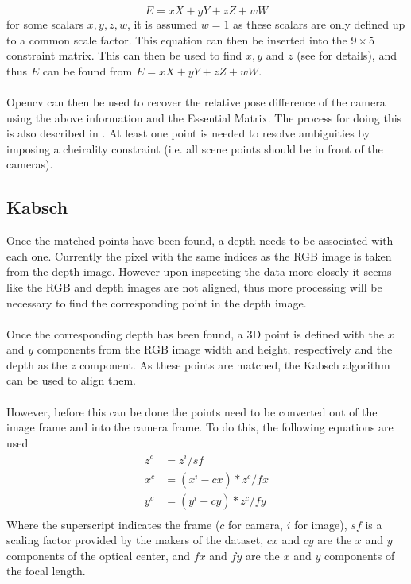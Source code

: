 \documentclass[12pt,a4paper]{article}
\begin{document}
\[
E = xX + yY + zZ + wW
\]
for some scalars $x,y,z,w$, it is assumed $w=1$ as these scalars are only defined up to a common scale factor. This equation can then be inserted into the $9 \times 5$ constraint matrix. This can then be used to find $x,y$ and $z$ (see \cite{nister2003efficient} for details), and thus $E$ can be found from $E = xX + yY + zZ + wW$.
\\\\
Opencv can then be used to recover the relative pose difference of the camera using the above information and the Essential Matrix. The process for doing this is also described in \cite{nister2003efficient}. At least one point is needed to resolve ambiguities by imposing a cheirality constraint (i.e. all scene points should be in front of the cameras).

\subsection{Kabsch}
\label{ssec: kabsch}
Once the matched points have been found, a depth needs to be associated with each one. Currently the pixel with the same indices as the RGB image is taken from the depth image. However upon inspecting the data more closely it seems like the RGB and depth images are not aligned, thus more processing will be necessary to find the corresponding point in the depth image.
\\\\
Once the corresponding depth has been found, a 3D point is defined with the $x$ and $y$ components from the RGB image width and height, respectively and the depth as the $z$ component. As these points are matched, the Kabsch algorithm can be used to align them.
\\\\
However, before this can be done the points need to be converted out of the image frame and into the camera frame. To do this, the following equations are used
\begin{align*}
z^c &= z^i /sf \\
x^c &= (x^i - cx)*z^c / fx \\
y^c &= (y^i - cy)*z^c / fy \\
\end{align*}
Where the superscript indicates the frame ($c$ for camera, $i$ for image), $sf$ is a scaling factor provided by the makers of the dataset, $cx$ and $cy$ are the $x$ and $y$ components of the optical center, and $fx$ and $fy$ are the $x$ and $y$ components of the focal length.
\\\\
\end{document}
